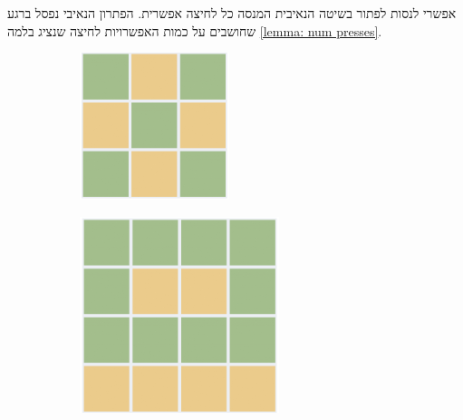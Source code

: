 \documentclass[12pt,leqno]{article}
\begin{document}
 אפשרי לנסות
לפתור בשיטה הנאיבית המנסה כל לחיצה אפשרית.
הפתרון הנאיבי נפסל ברגע שחושבים על כמות האפשרויות לחיצה
שנציג בלמה 
\ref{lemma: num presses}.

\begin{figure}[ht]
    \caption{פתרונות של משחק על לוחות שונים}
    \label{fig:sol_3_4_5}
    \centering
    \begin{subfigure}[b]{.25\linewidth}
    \includegraphics[width=\linewidth]{images/3x3_sol.PNG}
    \end{subfigure}
    \begin{subfigure}[b]{.25\linewidth}
    \includegraphics[width=\linewidth]{images/4x4_sol.PNG}

\end{subfigure}
\end{figure}
\end{document}
